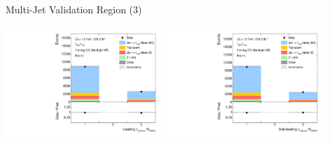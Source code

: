 \documentclass[11pt, xcolor={dvipsnames}, aspectratio=169]{beamer}
\begin{document}

\begin{frame}{Multi-Jet Validation Region (3)}
  \centering

  \includegraphics[width=0.45\textwidth]{fakefactors/fake_os_vr/Tau0Ntrk_fakevr}%
  \hfill%
  \includegraphics[width=0.45\textwidth]{fakefactors/fake_os_vr/Tau1Ntrk_fakevr}
\end{frame}

\end{document}
